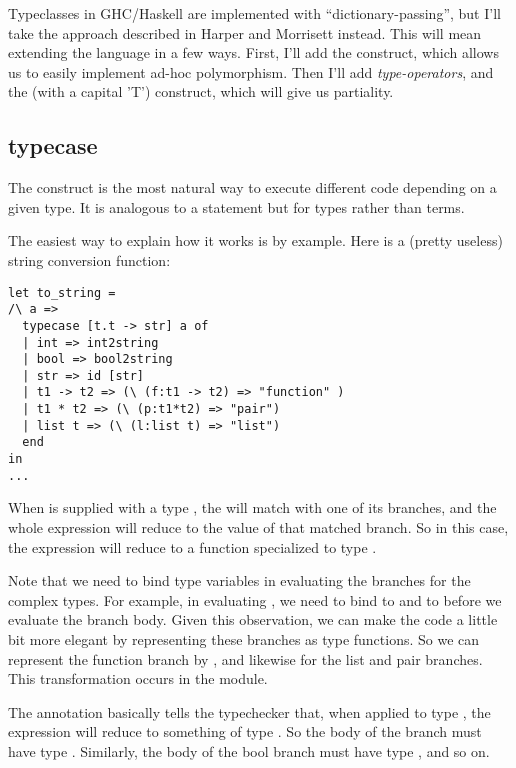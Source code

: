 \message{ !name(report.tex)}\documentclass[pageno]{jpaper}
\begin{document}
{{{Typeclasses in GHC/Haskell are implemented with ``dictionary-passing'', but I'll take the approach described
in Harper and Morrisett instead. This will mean extending the language in a few ways.  First, I'll add the
 construct, which allows us to easily implement ad-hoc polymorphism. Then I'll add
\textit{type-operators}, and the  (with a capital 'T') construct, which will give us
partiality.

\subsection{typecase}
The  construct is the most natural way to execute different code depending on a
given type. It is analogous to a  statement but for types rather than terms.

The easiest way to explain how it works is by example. Here is a (pretty useless) string conversion function:

\begin{lstlisting}[mathescape]
let to_string = 
/\ a =>
  typecase [t.t -> str] a of
  | int => int2string
  | bool => bool2string
  | str => id [str]
  | t1 -> t2 => (\ (f:t1 -> t2) => "function" )
  | t1 * t2 => (\ (p:t1*t2) => "pair")
  | list t => (\ (l:list t) => "list")
  end
in
...
\end{lstlisting}

When  is supplied with a type , the  will match 
with one of its branches, and the whole expression will reduce to the value of that matched branch.
So in this case, the expression will reduce to a  function specialized to
type .

Note that we need to bind type variables in evaluating the branches for the complex types. For example,
in evaluating , we need to bind  to  and  to  before we evaluate the branch body. 
Given this observation, we can make the code a little bit more elegant
by representing these branches as type functions. So we can represent the function branch by
, and likewise for the list and pair branches. This transformation
occurs in the  module.

The annotation \lsti{[t.t -> str]} basically tells the typechecker that, when applied to type , the  expression will reduce to something of type . 
So the body of the  branch must have type .
Similarly, the body of the bool branch must have type , and so on.

}}}
\end{document}
